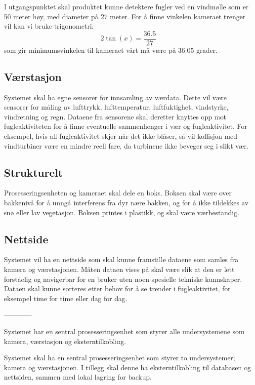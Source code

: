 I utgangspunktet skal produktet kunne detektere fugler ved en vindmølle som er 50 meter høy, med diameter på 27 meter. For å finne vinkelen kameraet trenger vil kan vi bruke trigonometri.
\begin{equation}
    2\tan(x)=\frac{36.5}{27}
\end{equation}
som gir minimumsvinkelen til kameraet vårt må være på 36.05 grader. 

\subsection{Værstasjon}
Systemet skal ha egne sensorer for innsamling av værdata. Dette vil være sensorer for måling av lufttrykk, lufttemperatur, luftfuktighet, vindstyrke, vindretning og regn. Dataene fra sensorene skal deretter knyttes opp mot fugleaktiviteten for å finne eventuelle sammenhenger i vær og fugleaktivitet. For eksempel, hvis all fugleaktivitet skjer når det ikke blåser, så vil kollisjon med vindturbiner være en mindre reell fare, da turbinene ikke beveger seg i slikt vær. 

\subsection{Strukturelt}

Prosesseringsenheten og kameraet skal dele en boks. Boksen skal være over bakkenivå for å unngå interferens fra dyr nære bakken, og for å ikke tildekkes av snø eller lav vegetasjon. Boksen printes i plastikk, og skal være værbestandig. 

\subsection{Nettside}

Systemet vil ha en nettside som skal kunne framstille dataene som samles fra kamera og værstasjonen. Måten dataen vises på skal være slik at den er lett forståelig og navigerbar for en bruker uten noen spesielle tekniske kunnskaper. Dataen skal kunne sorteres etter behov for å se trender i fugleaktivitet, for eksempel time for time eller dag for dag. 




------------

Systemet har en sentral prosesseringsenhet som styrer alle undersystemene som kamera, værstasjon og eksterntilkobling. 

Systemet skal ha en sentral prosesseringsenhet som styrer to undersystemer; kamera og værstasjonen. I tillegg skal denne ha eksterntilkobling til databasen og nettsiden, sammen med lokal lagring for backup. 

